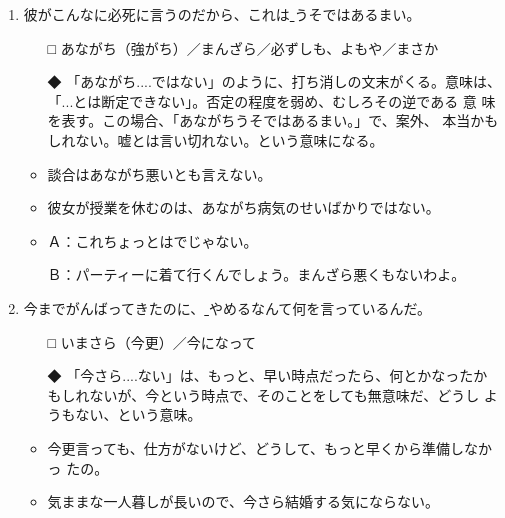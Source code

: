 \documentclass[
uplatex,
b5paper,
10pt,
dvipdfmx
]{jsbook}
\begin{document}
\begin{enumerate}
\item 彼がこんなに必死に言うのだから、これは\underline{    }うそではあるまい。
\begin{itemize}
\item[□] あながち（強がち）／まんざら／必ずしも、よもや／まさか
\item[◆] 「あながち....ではない」のように、打ち消しの文末がくる。意味は、
	  「...とは断定できない」。否定の程度を弱め、むしろその逆である
	  意 味を表す。この場合、「あながちうそではあるまい。」で、案外、
	  本当かもしれない。嘘とは言い切れない。という意味になる。
\end{itemize}
\begin{itemize}
\item 談合はあながち悪いとも言えない。
\item 彼女が授業を休むのは、あながち病気のせいばかりではない。
\item Ａ：これちょ{}っとはでじゃない。

      Ｂ：パーティーに着て行くんでしょう。まんざら悪くもないわよ。
\end{itemize}

\item 今までがんばってきたのに、\underline{   }やめるなんて何を言っているんだ。
\begin{itemize}
\item[□] いまさら（今更）／今になって
\item[◆] 「今さら....ない」は、もっと、早い時点だったら、何とかなったか
	  もしれないが、今という時点で、そのことをしても無意味だ、どうし
	  ようもない、という意味。
\end{itemize}
\begin{itemize}
\item 今更言っても、仕方がないけど、どうして、もっと早くから準備しなかっ
      たの。
\item 気ままな一人暮しが長いので、今さら結婚する気にならない。
\end{itemize}


\end{enumerate}
\end{document}
